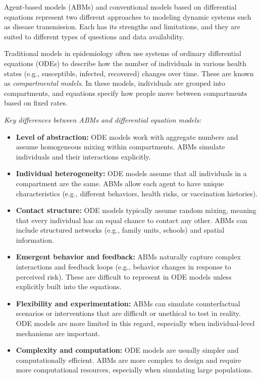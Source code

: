 \documentclass{article}
\begin{document}
Agent-based models (ABMs) and conventional models based on differential equations represent two different approaches to modeling dynamic systems such as disease transmission. Each has its strengths and limitations, and they are suited to different types of questions and data availability.

Traditional models in epidemiology often use systems of ordinary differential equations (ODEs) to describe how the number of individuals in various health states (e.g., susceptible, infected, recovered) changes over time. These are known as \emph{compartmental models}. In these models, individuals are grouped into compartments, and equations specify how people move between compartments based on fixed rates.

\emph{Key differences between ABMs and differential equation models:}
\begin{itemize}
    \item \textbf{Level of abstraction:} ODE models work with aggregate numbers and assume homogeneous mixing within compartments. ABMs simulate individuals and their interactions explicitly.
    
    \item \textbf{Individual heterogeneity:} ODE models assume that all individuals in a compartment are the same. ABMs allow each agent to have unique characteristics (e.g., different behaviors, health risks, or vaccination histories).
    
    \item \textbf{Contact structure:} ODE models typically assume random mixing, meaning that every individual has an equal chance to contact any other. ABMs can include structured networks (e.g., family units, schools) and spatial information.
    
    \item \textbf{Emergent behavior and feedback:} ABMs naturally capture complex interactions and feedback loops (e.g., behavior changes in response to perceived risk). These are difficult to represent in ODE models unless explicitly built into the equations.
    
    \item \textbf{Flexibility and experimentation:} ABMs can simulate counterfactual scenarios or interventions that are difficult or unethical to test in reality. ODE models are more limited in this regard, especially when individual-level mechanisms are important.
    
    \item \textbf{Complexity and computation:} ODE models are usually simpler and computationally efficient. ABMs are more complex to design and require more computational resources, especially when simulating large populations.
    

\end{itemize}
\end{document}
